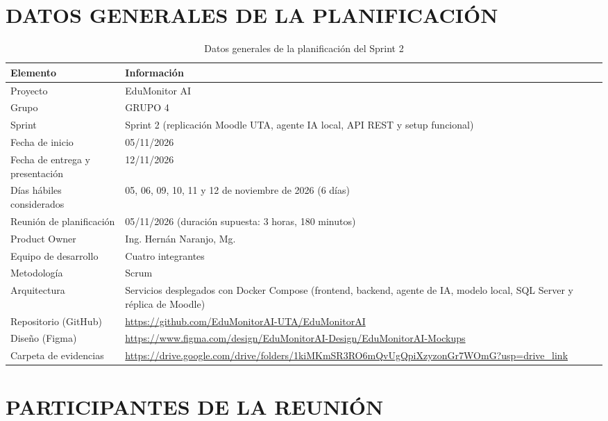 \documentclass[11pt,a4paper]{article}
\newcommand{\hd}[1]{\textbf{#1}}
\begin{document}
\section{DATOS GENERALES DE LA PLANIFICACIÓN}

\begin{table}[H]
\centering\small
\caption{Datos generales de la planificación del Sprint 2}
\begin{tabularx}{\textwidth}{|R{4.4cm}|Y|}
\hline
\hd{Elemento} & \hd{Información}\\ \hline
Proyecto & EduMonitor AI\\ \hline
Grupo & GRUPO 4\\ \hline
Sprint & Sprint 2 (replicación Moodle UTA, agente IA local, API REST y setup funcional)\\ \hline
Fecha de inicio & 05/11/2026\\ \hline
Fecha de entrega y presentación & 12/11/2026\\ \hline
Días hábiles considerados & 05, 06, 09, 10, 11 y 12 de noviembre de 2026 (6 días)\\ \hline
Reunión de planificación & 05/11/2026 (duración supuesta: 3 horas, 180 minutos)\\ \hline
Product Owner & Ing. Hernán Naranjo, Mg.\\ \hline
Equipo de desarrollo & Cuatro integrantes\\ \hline
Metodología & Scrum\\ \hline
Arquitectura & Servicios desplegados con Docker Compose (frontend, backend, agente de IA, modelo local, SQL Server y réplica de Moodle)\\ \hline
Repositorio (GitHub) & \url{https://github.com/EduMonitorAI-UTA/EduMonitorAI}\\ \hline
Diseño (Figma) & \url{https://www.figma.com/design/EduMonitorAI-Design/EduMonitorAI-Mockups}\\ \hline
Carpeta de evidencias & \url{https://drive.google.com/drive/folders/1kiMKmSR3RO6mQvUgQpiXzyzonGr7WOmG?usp=drive_link}\\ \hline
\end{tabularx}
\end{table}

\section{PARTICIPANTES DE LA REUNIÓN}
\end{document}
